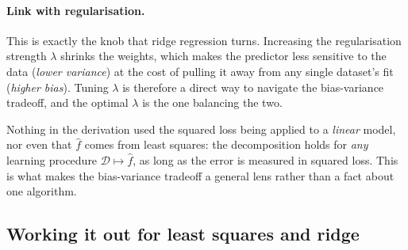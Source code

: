 \begin{center}
\end{center}

\paragraph{Link with regularisation.}
This is exactly the knob that ridge regression turns. Increasing the regularisation
strength $\lambda$ shrinks the weights, which makes the predictor less sensitive to
the data (\emph{lower variance}) at the cost of pulling it away from any single
dataset's fit (\emph{higher bias}). Tuning $\lambda$ is therefore a direct way to
navigate the bias-variance tradeoff, and the optimal $\lambda$ is the one balancing
the two.

\begin{remark}
Nothing in the derivation used the squared loss being applied to a \emph{linear}
model, nor even that $\hat f$ comes from least squares: the decomposition holds for
\emph{any} learning procedure $\mathcal{D} \mapsto \hat f$, as long as the error is
measured in squared loss. This is what makes the bias-variance tradeoff a general
lens rather than a fact about one algorithm.
\end{remark}


\subsection{Working it out for least squares and ridge}
\label{subsec:bv-ridge}

